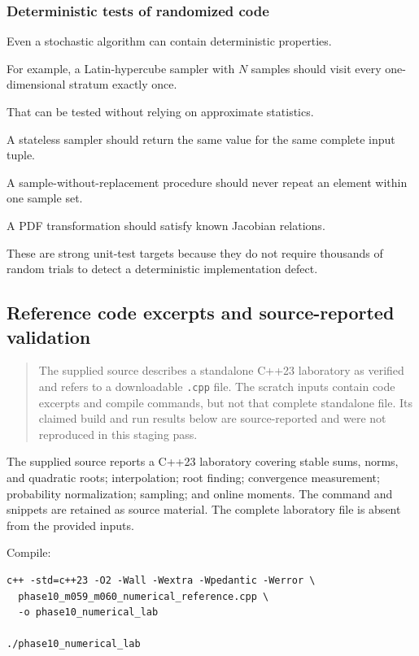 \subsubsection{Deterministic tests of randomized code}\label{02-foundations-ii-ch031-deterministic-tests-of-randomized-code}

Even a stochastic algorithm can contain deterministic properties.

For example, a Latin-hypercube sampler with \(N\) samples should visit every one-dimensional stratum exactly once.

That can be tested without relying on approximate statistics.

A stateless sampler should return the same value for the same complete input tuple.

A sample-without-replacement procedure should never repeat an element within one sample set.

A PDF transformation should satisfy known Jacobian relations.

These are strong unit-test targets because they do not require thousands of random trials to detect a deterministic implementation defect.

\subsection{Reference code excerpts and source-reported validation}\label{02-foundations-ii-ch031-reference-code-excerpts-and-source-reported-validation}

\begin{quote}
The supplied source describes a standalone C++23 laboratory as verified and refers to a downloadable \texttt{.cpp} file. The scratch inputs contain code excerpts and compile commands, but not that complete standalone file. Its claimed build and run results below are source-reported and were not reproduced in this staging pass.
\end{quote}

The supplied source reports a C++23 laboratory covering stable sums, norms, and quadratic roots; interpolation; root finding; convergence measurement; probability normalization; sampling; and online moments. The command and snippets are retained as source material. The complete laboratory file is absent from the provided inputs.

Compile:

\begin{verbatim}
c++ -std=c++23 -O2 -Wall -Wextra -Wpedantic -Werror \
  phase10_m059_m060_numerical_reference.cpp \
  -o phase10_numerical_lab

./phase10_numerical_lab
\end{verbatim}

